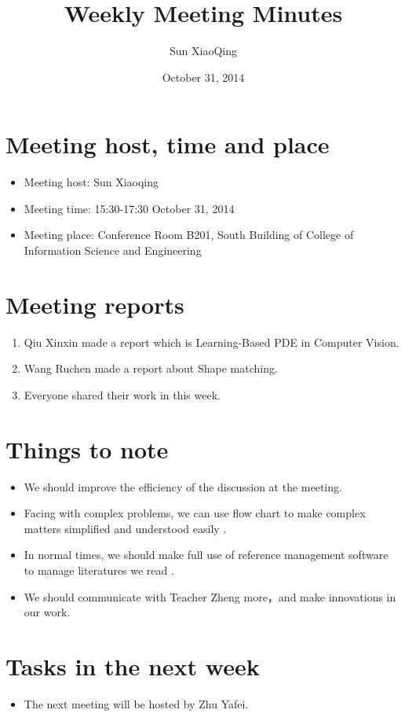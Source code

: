 \documentclass[a4paper，12pt]{article}
\title{Weekly Meeting Minutes}
\author{Sun  XiaoQing}
\date{October  31, 2014}
\begin{document}
\maketitle

\section{Meeting host, time and place}

\begin{itemize}
\item Meeting host: Sun Xiaoqing
\item Meeting time: 15:30-17:30 October 31, 2014 
\item Meeting place: Conference Room B201, South Building of College of Information Science and Engineering 
\end{itemize}

\section{Meeting reports}

\begin{enumerate}
\item Qiu Xinxin made a report  which  is Learning-Based PDE in Computer Vision. 
\item Wang Ruchen made a report about Shape matching.
\item Everyone shared their work in this week.
\end{enumerate}

\section {Things to note}

\begin{itemize}
\item We should improve the efficiency of the  discussion at the meeting.
\item Facing with complex problems, we can use  flow chart to make complex matters simplified and understood easily .
\item In normal times, we should make full use of  reference management software to manage literatures we read .
\item We should communicate with Teacher  Zheng more，and make innovations in our work.
\end{itemize}

\section {Tasks in the next week}

\begin{itemize}
\item The next meeting will be hosted by Zhu Yafei.
\end{itemize}
\end{document}
